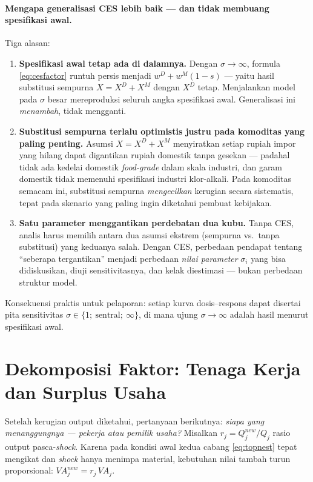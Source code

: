 \documentclass[11pt,a4paper]{article}
\newcommand{\en}[1]{\textit{#1}}   %
\begin{document}
\paragraph{Mengapa generalisasi CES lebih baik --- dan tidak membuang
spesifikasi awal.} Tiga alasan:
\begin{enumerate}[nosep]
\item \textbf{Spesifikasi awal tetap ada di dalamnya.} Dengan
      $\sigma \to \infty$, formula \eqref{eq:cesfactor} runtuh persis
      menjadi $w^D + w^M(1-s)$ --- yaitu hasil substitusi sempurna
      $X = X^D + X^M$ dengan $X^D$ tetap. Menjalankan model pada
      $\sigma$ besar mereproduksi seluruh angka spesifikasi awal.
      Generalisasi ini \emph{menambah}, tidak mengganti.
\item \textbf{Substitusi sempurna terlalu optimistis justru pada komoditas
      yang paling penting.} Asumsi $X = X^D + X^M$ menyiratkan setiap
      rupiah impor yang hilang dapat digantikan rupiah domestik tanpa
      gesekan --- padahal tidak ada kedelai domestik \en{food-grade} dalam
      skala industri, dan garam domestik tidak memenuhi spesifikasi
      industri klor-alkali. Pada komoditas semacam ini, substitusi sempurna
      \emph{mengecilkan} kerugian secara sistematis, tepat pada skenario
      yang paling ingin diketahui pembuat kebijakan.
\item \textbf{Satu parameter menggantikan perdebatan dua kubu.} Tanpa CES,
      analis harus memilih antara dua asumsi ekstrem (sempurna vs.\ tanpa
      substitusi) yang keduanya salah. Dengan CES, perbedaan pendapat
      tentang ``seberapa tergantikan'' menjadi perbedaan \emph{nilai
      parameter} $\sigma_i$ yang bisa didiskusikan, diuji sensitivitasnya,
      dan kelak diestimasi --- bukan perbedaan struktur model.
\end{enumerate}
Konsekuensi praktis untuk pelaporan: setiap kurva dosis--respons dapat
disertai pita sensitivitas $\sigma \in \{1;\ \text{sentral};\ \infty\}$,
di mana ujung $\sigma \to \infty$ adalah hasil menurut spesifikasi awal.

\section{Dekomposisi Faktor: Tenaga Kerja dan Surplus Usaha}
\label{sec:factor}

Setelah kerugian output diketahui, pertanyaan berikutnya: \emph{siapa yang
menanggungnya --- pekerja atau pemilik usaha?} Misalkan
$r_j = Q^{new}_j / Q_j$ rasio output pasca-\en{shock}. Karena pada kondisi
awal kedua cabang \eqref{eq:topnest} tepat mengikat dan \en{shock} hanya
menimpa material, kebutuhan nilai tambah turun proporsional:
$VA^{new}_j = r_j \, VA_j$.
\end{document}
